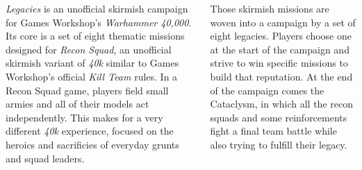 \clearpage
{}

\begin{columns}

  \emph{Legacies} is an unofficial skirmish campaign for Games
  Workshop's \emph{Warhammer 40,000}.  Its core is a set of eight
  thematic missions designed for \emph{Recon Squad}, an unofficial
  skirmish variant of \emph{40k} similar to Games Workshop's official
  \emph{Kill Team} rules.  In a Recon Squad game, players field small
  armies and all of their models act independently.  This makes for a
  very different \emph{40k} experience, focused on the heroics and
  sacrificies of everyday grunts and squad leaders.

  Those skirmish missions are woven into a campaign by a set of eight
  legacies.  Players choose one at the start of the campaign and
  strive to win specific missions to build that reputation.  At the
  end of the campaign comes the Cataclysm, in which all the recon
  squads and some reinforcements fight a final team battle while also
  trying to fulfill their legacy.



\end{columns}
